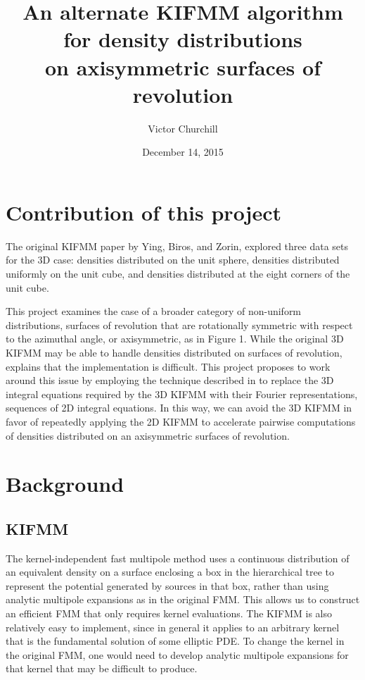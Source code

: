 \documentclass[12pt,letterpaper]{article}
\begin{document}

\title{An alternate KIFMM algorithm for density distributions\\on axisymmetric surfaces of revolution}
\date{December 14, 2015}
\author{Victor Churchill}
\clearpage
\maketitle
\thispagestyle{empty}

\newpage

\section{Contribution of this project}

The original KIFMM paper by Ying, Biros, and Zorin, explored three data sets for the 3D case: densities distributed on the unit sphere, densities distributed uniformly on the unit cube, and densities distributed at the eight corners of the unit cube.

This project examines the case of a broader category of non-uniform distributions, surfaces of revolution that are rotationally symmetric with respect to the azimuthal angle, or axisymmetric, as in Figure 1. While the original 3D KIFMM may be able to handle densities distributed on surfaces of revolution, \cite{YBZ} explains that the implementation is difficult. This project proposes to work around this issue by employing the technique described in \cite{YYM} to replace the 3D integral equations required by the 3D KIFMM with their Fourier representations, sequences of 2D integral equations. In this way, we can avoid the 3D KIFMM in favor of repeatedly applying the 2D KIFMM to accelerate pairwise computations of densities distributed on an axisymmetric surfaces of revolution.

\section{Background}

\subsection{KIFMM}
The kernel-independent fast multipole method uses a continuous distribution of an equivalent density on a surface enclosing a box in the hierarchical tree to represent the potential generated by sources in that box, rather than using analytic multipole expansions as in the original FMM. This allows us to construct an efficient FMM that only requires kernel evaluations. The KIFMM is also relatively easy to implement, since in general it applies to an arbitrary kernel that is the fundamental solution of some elliptic PDE. To change the kernel in the original FMM, one would need to develop analytic multipole expansions for that kernel that may be difficult to produce.
\end{document}
